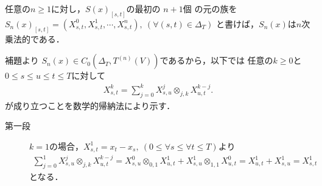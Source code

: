 	\begin{screen}
		\begin{thm}[逐次積分により定まる乗法的汎関数]
		\label{thm:signature_of_path_multiplicative}
			任意の$n \geq 1$に対し，$S(x)_{[s,t]}$の最初の
			$n+1$個\footnotemark
			の元の族を$S_n(x)_{[s,t]} = (X^0_{s,t},X^1_{s,t},\cdots,X^n_{s,t}),\ 
			(\forall (s,t) \in \Delta_T)$
			と書けば，$S_n(x)$は$n$次乗法的である．
		\end{thm}
	\end{screen}
	
	\begin{prf}
		補題より
		$S_n(x) \in C_0 \left(\Delta_T,T^{(n)}(V) \right)$であるから，以下では
		任意の$k \geq 0$と$0 \leq s \leq u \leq t \leq T$に対して
		\begin{align}
			X^k_{s,t} = \sum_{j=0}^k X^j_{s,u} \otimes_{j,k} X^{k-j}_{u,t}.
			\label{eq:thm_signature_of_path_multiplicative_1}
		\end{align}
		が成り立つことを数学的帰納法により示す．
		\begin{description}
			\item[第一段]$k=1$の場合，$X^1_{s,t} = x_t - x_s,\ (0 \leq \forall s \leq \forall t \leq T)$より
				\begin{align}
					\sum_{j=0}^1 X^j_{s,u} \otimes_{j,k} X^{k-j}_{u,t}
					= X^0_{s,u} \otimes_{0,1} X^1_{u,t}
					+ X^1_{s,u} \otimes_{1,1} X^0_{u,t}
					= X^1_{u,t} + X^1_{s,u}
					= X^1_{s,t}
				\end{align}
				となる．
				

\end{description}
\end{prf}
